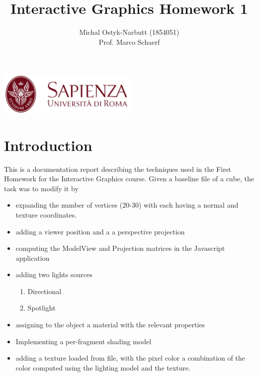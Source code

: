 \documentclass[12pt,a4paper]{article}
\begin{document}
\title{Interactive Graphics Homework 1}
\author{Michal Ostyk-Narbutt (1854051)\\ Prof. Marco Schaerf }

\maketitle


\begin{center}
\includegraphics[width=0.5\textwidth]{img/sapienza_logo.jpg}
\end{center}
\maketitle
\tableofcontents

\section{Introduction}


This is a documentation report describing the techniques used in the First Homework for the Interactive Graphics course. Given a baseline file of a cube, the task was to modify it by
\begin{itemize}
\item  expanding the number of vertices (20-30) with each having a normal and texture coordinates.
\item adding a viewer position and a a perspective projection
\item computing the ModelView and Projection matrices in the Javascript application
\item adding two lights sources
\begin{enumerate}
\item Directional
\item Spotlight
\end{enumerate}
\item assigning to the object a material with the relevant properties
\item  Implementing a per-fragment shading model
\item adding a texture loaded from file, with the pixel color a combination of the color
computed using the lighting model and the texture.
\end{itemize}
\end{document}
